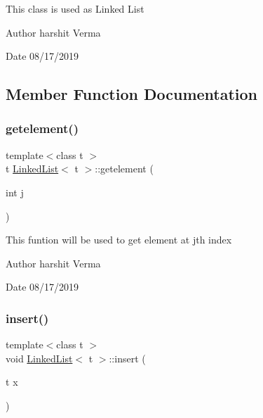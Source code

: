 This class is used as Linked List \begin{DoxyAuthor}{Author}
harshit Verma 
\end{DoxyAuthor}
\begin{DoxyDate}{Date}
08/17/2019 
\end{DoxyDate}


\subsection{Member Function Documentation}
\mbox{\label{classLinkedList_aca15dfd242beef3db4fbff0df1571043}} 
\subsubsection{\texorpdfstring{getelement()}{getelement()}}
{\footnotesize\ttfamily template$<$class t $>$ \\
t \hyperlink{classLinkedList}{Linked\+List}$<$ t $>$\+::getelement (\begin{DoxyParamCaption}\item[{int}]{j }\end{DoxyParamCaption})\hspace{0.3cm}{\ttfamily [inline]}}

This funtion will be used to get element at jth index \begin{DoxyAuthor}{Author}
harshit Verma 
\end{DoxyAuthor}
\begin{DoxyDate}{Date}
08/17/2019 
\end{DoxyDate}
\mbox{\label{classLinkedList_a78c01c1f298ae68de1f090649faa36a7}} 
\subsubsection{\texorpdfstring{insert()}{insert()}}
{\footnotesize\ttfamily template$<$class t $>$ \\
void \hyperlink{classLinkedList}{Linked\+List}$<$ t $>$\+::insert (\begin{DoxyParamCaption}\item[{t}]{x }\end{DoxyParamCaption})\hspace{0.3cm}{\ttfamily [inline]}}

